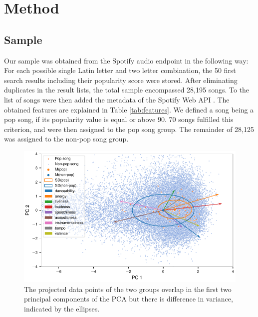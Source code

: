 \documentclass{article}
\begin{document}
\section{Method}

\subsection{Sample}
Our sample was obtained from the Spotify audio endpoint in the following way: For each possible single Latin letter and two letter combination, the 50 first search results including their popularity score were stored. After eliminating duplicates in the result lists, the total sample encompassed 28,195 songs. To the list of songs were then added the metadata of the Spotify Web API \citep{spotifyDocu}.
The obtained features are explained in Table \ref{tab:features}. We defined a song being a pop song, if its popularity value is equal or above 90. 70 songs fulfilled this criterion, and were then assigned to the pop song group. The remainder of 28,125 was assigned to the non-pop song group. 

\begin{figure}[!b]
  \centering
  \includegraphics[]{../fig/001_pca.pdf}
  \vspace*{-8mm}  
  \caption{The projected data points of the two groups overlap in the first two principal components of the PCA but there is difference in variance, indicated by the ellipses.}
  \label{fig:pca}
\end{figure}
\end{document}
